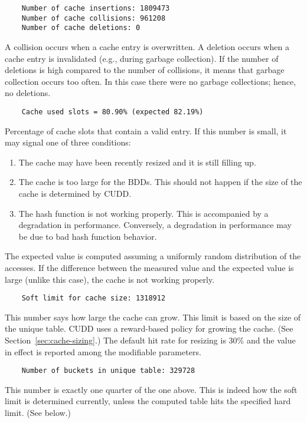 \documentclass[11pt]{article}
\begin{document}
\begin{verbatim}
    Number of cache insertions: 1809473
    Number of cache collisions: 961208
    Number of cache deletions: 0
\end{verbatim}
A collision occurs when a cache entry is
overwritten. A deletion
occurs when a cache entry is invalidated (e.g., during garbage
collection).  If the number of deletions is high compared to the
number of collisions, it means that garbage collection occurs too
often. In this case there were no garbage collections; hence, no
deletions.

\begin{verbatim}
    Cache used slots = 80.90% (expected 82.19%)
\end{verbatim}
Percentage of cache slots that contain a valid entry. If this
number is small, it may signal one of three conditions:
\begin{enumerate}
\item The cache may have been recently resized and it is still filling
  up.
\item The cache is too large for the BDDs. This should not happen if
  the size of the cache is determined by CUDD.
\item The hash function is not working properly. This is accompanied
  by a degradation in performance. Conversely, a degradation in
  performance may be due to bad hash function behavior.
\end{enumerate}
The expected value is computed assuming a uniformly random
distribution of the accesses.  If the difference between the measured
value and the expected value is large (unlike this case), the cache is
not working properly.

\begin{verbatim}
    Soft limit for cache size: 1318912
\end{verbatim}
This number says how large the cache can grow. This limit is based on
the size of the unique table.  CUDD uses a reward-based policy for
growing the cache. (See Section~\ref{sec:cache-sizing}.)  The default
hit rate for resizing is 30\% and the value in effect is reported
among the modifiable parameters.

\begin{verbatim}
    Number of buckets in unique table: 329728
\end{verbatim}
This number is exactly one quarter of the one above. This is indeed
how the soft limit is determined currently, unless the computed table
hits the specified hard limit. (See below.)
\end{document}
